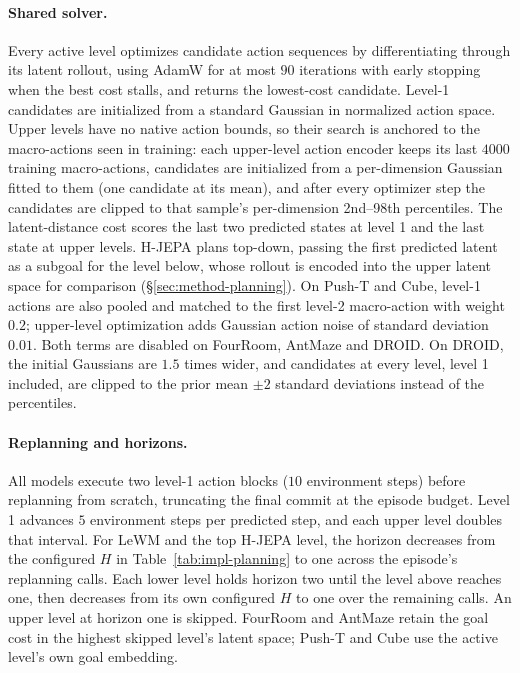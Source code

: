 \paragraph{Shared solver.} Every active level optimizes candidate action sequences
by differentiating through its latent rollout, using AdamW for at most $90$
iterations with early stopping when the best cost stalls, and returns the lowest-cost
candidate. Level-1 candidates are initialized from a standard Gaussian in normalized
action space. Upper levels have no native action bounds, so their search is anchored
to the macro-actions seen in training: each upper-level action encoder keeps its last
$4000$ training macro-actions, candidates are initialized from a per-dimension Gaussian
fitted to them (one candidate at its mean), and after every optimizer step the
candidates are clipped to that sample's per-dimension 2nd--98th percentiles. The latent-distance cost scores the last
two predicted states at level 1 and the last state at upper levels. H-JEPA plans
top-down, passing the first predicted latent as a subgoal for the level below,
whose rollout is encoded into the upper latent space for comparison
(\S\ref{sec:method-planning}). On Push-T and Cube, level-1 actions are also pooled
and matched to the first level-2 macro-action with weight $0.2$; upper-level
optimization adds Gaussian action noise of standard deviation $0.01$. Both terms
are disabled on FourRoom, AntMaze and DROID. On DROID, the initial Gaussians are
$1.5$ times wider, and candidates at every level, level 1 included, are clipped to
the prior mean $\pm 2$ standard deviations instead of the percentiles.

\paragraph{Replanning and horizons.} All models execute two level-1 action blocks
($10$ environment steps) before replanning from scratch, truncating the final
commit at the episode budget. Level 1 advances $5$ environment steps per predicted
step, and each upper level doubles that interval. For LeWM and the top H-JEPA
level, the horizon decreases from the configured $H$ in
Table~\ref{tab:impl-planning} to one across the episode's replanning calls. Each
lower level holds horizon two until the level above reaches one, then decreases
from its own configured $H$ to one over the remaining calls. An upper level at
horizon one is skipped. FourRoom and AntMaze retain the goal cost in the highest
skipped level's latent space; Push-T and Cube use the active level's own goal
embedding.

